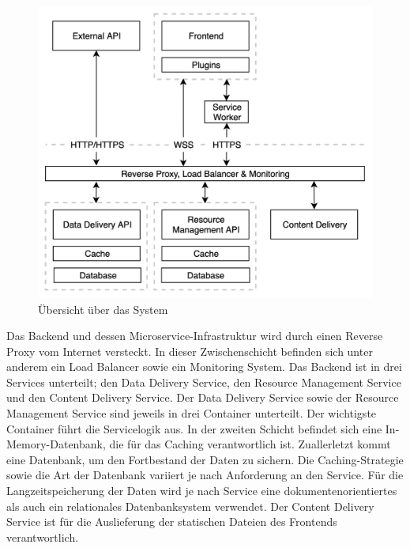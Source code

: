 \begin{figure}
    \begin{center}
    \includegraphics[scale=0.2]{img/abbildungen/MicroserviceInfrastruktur}
    \end{center}
    \caption{Übersicht über das System}
    \label{figure:uebersichtueberdassystem}
\end{figure}

Das Backend und dessen Microservice-Infrastruktur wird durch einen Reverse Proxy vom Internet versteckt.
In dieser Zwischenschicht befinden sich unter anderem ein Load Balancer sowie ein Monitoring System.
Das Backend ist in drei Services unterteilt; den Data Delivery Service, den Resource Management Service
und den Content Delivery Service. Der Data Delivery Service sowie der Resource Management Service sind jeweils
in drei Container unterteilt. Der wichtigste Container führt die Servicelogik aus. In der zweiten
Schicht befindet sich eine In-Memory-Datenbank, die für das Caching verantwortlich ist. Zuallerletzt
kommt eine Datenbank, um den Fortbestand der Daten zu sichern. Die Caching-Strategie sowie die Art der
Datenbank variiert je nach Anforderung an den Service. Für die Langzeitspeicherung der Daten wird je nach Service
eine dokumentenorientiertes als auch ein relationales Datenbanksystem verwendet. Der Content Delivery Service
ist für die Auslieferung der statischen Dateien des Frontends verantwortlich.

